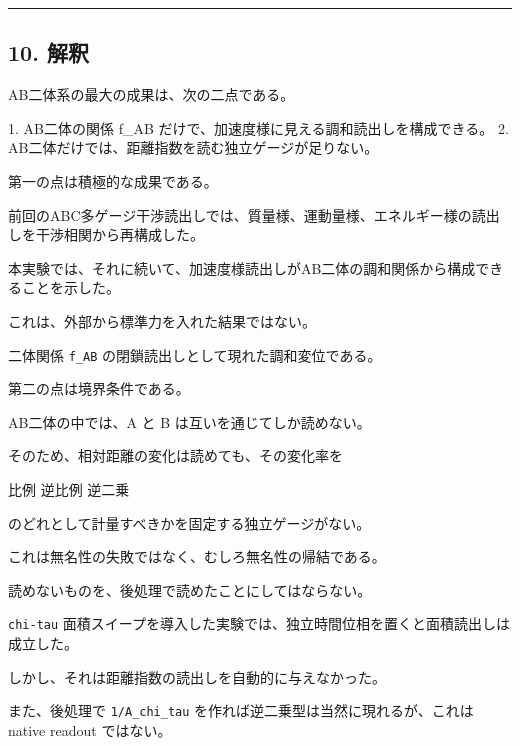 \documentclass[
]{article}
\newenvironment{Shaded}{}{}
\newcommand{\NormalTok}[1]{#1}
\begin{document}
\begin{center}\rule{0.5\linewidth}{0.5pt}\end{center}

\subsection{10. 解釈}\label{ux89e3ux91c8}

AB二体系の最大の成果は、次の二点である。

\begin{Shaded}
\begin{Highlighting}[]
\NormalTok{1. AB二体の関係 f\_AB だけで、加速度様に見える調和読出しを構成できる。}
\NormalTok{2. AB二体だけでは、距離指数を読む独立ゲージが足りない。}
\end{Highlighting}
\end{Shaded}

第一の点は積極的な成果である。

前回のABC多ゲージ干渉読出しでは、質量様、運動量様、エネルギー様の読出しを干渉相関から再構成した。

本実験では、それに続いて、加速度様読出しがAB二体の調和関係から構成できることを示した。

これは、外部から標準力を入れた結果ではない。

二体関係 \texttt{f\_AB} の閉鎖読出しとして現れた調和変位である。

第二の点は境界条件である。

AB二体の中では、A と B は互いを通じてしか読めない。

そのため、相対距離の変化は読めても、その変化率を

\begin{Shaded}
\begin{Highlighting}[]
\NormalTok{比例}
\NormalTok{逆比例}
\NormalTok{逆二乗}
\end{Highlighting}
\end{Shaded}

のどれとして計量すべきかを固定する独立ゲージがない。

これは無名性の失敗ではなく、むしろ無名性の帰結である。

読めないものを、後処理で読めたことにしてはならない。

\texttt{chi-tau}
面積スイープを導入した実験では、独立時間位相を置くと面積読出しは成立した。

しかし、それは距離指数の読出しを自動的に与えなかった。

また、後処理で \texttt{1/A\_chi\_tau}
を作れば逆二乗型は当然に現れるが、これは native readout ではない。
\end{document}
